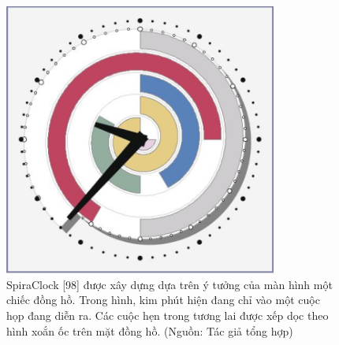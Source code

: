 \begin{figure}[H] %
    \centering %
    \includegraphics[width=0.8\textwidth]{assets/fig_7_11.png} 
    \caption{SpiraClock [98] được xây dựng dựa trên ý tưởng của màn hình một chiếc đồng hồ. Trong hình, kim phút hiện đang chỉ vào một cuộc họp đang diễn ra. Các cuộc hẹn trong tương lai được xếp dọc theo hình xoắn ốc trên mặt đồng hồ. (Nguồn: Tác giả tổng hợp)} %
    \label{fig:f7.11}
\end{figure}